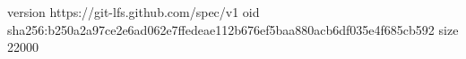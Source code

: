 version https://git-lfs.github.com/spec/v1
oid sha256:b250a2a97ce2e6ad062e7ffedeae112b676ef5baa880acb6df035e4f685cb592
size 22000
